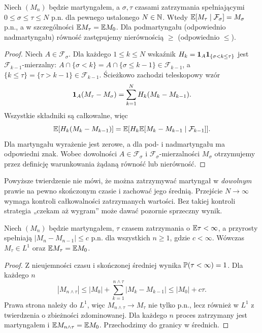 \begin{twierdzenie}
Niech $(M_n)$ będzie martyngałem, a $\sigma,\tau$
czasami zatrzymania spełniającymi
$0\leq\sigma\leq\tau\leq N$ p.n. dla pewnego
ustalonego $N\in\mathbb{N}$. Wtedy
$\mathbb{E}[M_\tau\mid\mathcal F_\sigma]=M_\sigma$ p.n.,
a w szczególności $\mathbb{E} M_\tau=\mathbb{E} M_0$.
Dla podmartyngału (odpowiednio nadmartyngału)
równość zastępujemy nierównością $\geq$
(odpowiednio $\leq$).
\end{twierdzenie}
\begin{proof}
Niech $A\in\mathcal F_\sigma$.
Dla każdego $1\leq k\leq N$ wskaźnik
$H_k=\mathbf{1}_{A}\mathbf{1}_{\{\sigma<k\leq\tau\}}$
jest $\mathcal F_{k-1}$-mierzalny:
$A\cap\{\sigma<k\}=A\cap\{\sigma\leq k-1\}
\in\mathcal F_{k-1}$,
a $\{k\leq\tau\}=\{\tau>k-1\}\in\mathcal F_{k-1}$.
Ścieżkowo zachodzi teleskopowy wzór
\[
\mathbf{1}_{A}(M_\tau-M_\sigma)
=\sum_{k=1}^N H_k(M_k-M_{k-1}).
\]
Wszystkie składniki są całkowalne, więc
\[
\mathbb{E}[H_k(M_k-M_{k-1})]
=\mathbb{E}[H_k\mathbb{E}[M_k-M_{k-1}\mid\mathcal F_{k-1}]].
\]
Dla martyngału wyrażenie jest zerowe,
a dla pod- i nadmartyngału ma odpowiedni znak.
Wobec dowolności $A\in\mathcal F_\sigma$
i $\mathcal F_\sigma$-mierzalności $M_\sigma$
otrzymujemy przez definicję warunkowania
żądaną równość lub nierówność.
\end{proof}

\begin{uwaga}
Powyższe twierdzenie nie mówi, że można zatrzymywać
martyngał w \emph{dowolnym} prawie na pewno
skończonym czasie i zachować jego średnią.
Przejście $N\to\infty$ wymaga kontroli
całkowalności zatrzymanych wartości.
Bez takiej kontroli strategia „czekam aż wygram”
może dawać pozornie sprzeczny wynik.
\end{uwaga}

\begin{twierdzenie}
Niech $(M_n)$ będzie martyngałem, $\tau$
czasem zatrzymania o $\mathbb{E}\tau<\infty$,
a przyrosty spełniają
$|M_n-M_{n-1}|\leq c$ p.n. dla wszystkich $n\geq1$,
gdzie $c<\infty$. Wówczas $M_\tau\in L^1$
oraz $\mathbb{E} M_\tau=\mathbb{E} M_0$.
\end{twierdzenie}
\begin{proof}
Z nieujemności czasu i skończonej średniej
wynika $\mathbb{P}(\tau<\infty)=1$. Dla każdego $n$
\[
|M_{n\wedge\tau}|
\leq|M_0|+\sum_{k=1}^{n\wedge\tau}|M_k-M_{k-1}|
\leq |M_0|+c\tau.
\]
Prawa strona należy do $L^1$, więc
$M_{n\wedge\tau}\to M_\tau$ nie tylko p.n.,
lecz również w $L^1$ z twierdzenia o zbieżności
zdominowanej. Dla każdego $n$ proces zatrzymany
jest martyngałem i $\mathbb{E} M_{n\wedge\tau}=\mathbb{E} M_0$.
Przechodzimy do granicy w średnich.
\end{proof}


